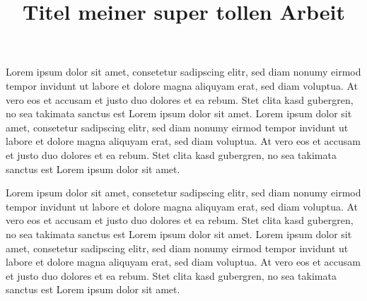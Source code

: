 \documentclass{scrreprt}
\title{Titel meiner super tollen Arbeit}
\begin{document}
\makeWhsThesisTitle
\makeStatutoryDeclaration

\clearpage
Lorem ipsum dolor sit amet, consetetur sadipscing elitr, sed diam nonumy eirmod tempor invidunt ut labore et dolore magna aliquyam erat, sed diam voluptua. At vero eos et accusam et justo duo dolores et ea rebum. Stet clita kasd gubergren, no sea takimata sanctus est Lorem ipsum dolor sit amet. Lorem ipsum dolor sit amet, consetetur sadipscing elitr, sed diam nonumy eirmod tempor invidunt ut labore et dolore magna aliquyam erat, sed diam voluptua. At vero eos et accusam et justo duo dolores et ea rebum. Stet clita kasd gubergren, no sea takimata sanctus est Lorem ipsum dolor sit amet.

Lorem ipsum dolor sit amet, consetetur sadipscing elitr, sed diam nonumy eirmod tempor invidunt ut labore et dolore magna aliquyam erat, sed diam voluptua. At vero eos et accusam et justo duo dolores et ea rebum. Stet clita kasd gubergren, no sea takimata sanctus est Lorem ipsum dolor sit amet. Lorem ipsum dolor sit amet, consetetur sadipscing elitr, sed diam nonumy eirmod tempor invidunt ut labore et dolore magna aliquyam erat, sed diam voluptua. At vero eos et accusam et justo duo dolores et ea rebum. Stet clita kasd gubergren, no sea takimata sanctus est Lorem ipsum dolor sit amet.
\end{document}
